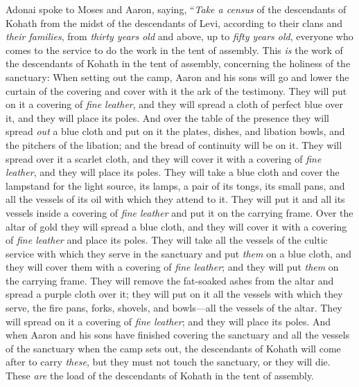 \begin{biblechapter} %
 Adonai spoke to Moses and Aaron, saying,
\verse “\textit{Take a census} of the descendants of Kohath from the midst of the descendants of Levi, according to their clans and \textit{their families},
\verse from \textit{thirty years old} and above, up to \textit{fifty years old}, everyone who comes to the service to do the work in the tent of assembly.
\verse This \textit{is} the work of the descendants of Kohath in the tent of assembly, concerning the holiness of the sanctuary:
\verse When setting out the camp, Aaron and his sons will go and lower the curtain of the covering and cover with it the ark of the testimony.
\verse They will put on it a covering of \textit{fine leather}, and they will spread a cloth of perfect blue over it, and they will place its poles.
\verse And over the table of the presence they will spread \textit{out} a blue cloth and put on it the plates, dishes, and libation bowls, and the pitchers of the libation; and the bread of continuity will be on it.
\verse They will spread over it a scarlet cloth, and they will cover it with a covering of \textit{fine leather}, and they will place its poles.
\verse They will take a blue cloth and cover the lampstand for the light source, its lamps, a pair of its tongs, its small pans, and all the vessels of its oil with which they attend to it.
\verse They will put it and all its vessels inside a covering of \textit{fine leather} and put it on the carrying frame.
\verse Over the altar of gold they will spread a blue cloth, and they will cover it with a covering of \textit{fine leather} and place its poles.
\verse They will take all the vessels of the cultic service with which they serve in the sanctuary and put \textit{them} on a blue cloth, and they will cover them with a covering of \textit{fine leather}; and they will put \textit{them} on the carrying frame.
\verse They will remove the fat-soaked ashes from the altar and spread a purple cloth over it;
\verse they will put on it all the vessels with which they serve, the fire pans, forks, shovels, and bowls—all the vessels of the altar. They will spread on it a covering of \textit{fine leather}; and they will place its poles.
\verse And when Aaron and his sons have finished covering the sanctuary and all the vessels of the sanctuary when the camp sets out, the descendants of Kohath will come after to carry \textit{these}, but they must not touch the sanctuary, or they will die. These \textit{are} the load of the descendants of Kohath in the tent of assembly.

\end{biblechapter}
